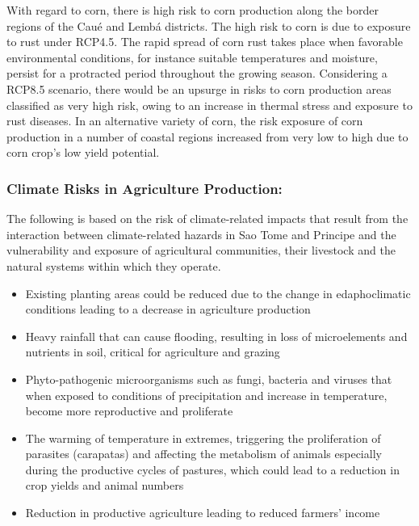 \documentclass[
]{book}
\providecommand{\tightlist}{%
  \setlength{\itemsep}{0pt}\setlength{\parskip}{0pt}}
\begin{document}
With regard to corn, there is high risk to corn production along the border regions of the Caué and Lembá districts. The high risk to corn is due to exposure to rust under RCP4.5. The rapid spread of corn rust takes place when favorable environmental conditions, for instance suitable temperatures and moisture, persist for a protracted period throughout the growing season. Considering a RCP8.5 scenario, there would be an upsurge in risks to corn production areas classified as very high risk, owing to an increase in thermal stress and exposure to rust diseases. In an alternative variety of corn, the risk exposure of corn production in a number of coastal regions increased from very low to high due to corn crop's low yield potential.

\hypertarget{climate-risks-in-agriculture-production-1}{%
\subsubsection{Climate Risks in Agriculture Production:}\label{climate-risks-in-agriculture-production-1}}

The following is based on the risk of climate-related impacts that result from the interaction between climate-related hazards in Sao Tome and Principe and the vulnerability and exposure of agricultural communities, their livestock and the natural systems within which they operate.

\begin{itemize}
\tightlist
\item
  Existing planting areas could be reduced due to the change in edaphoclimatic conditions leading to a decrease in agriculture production
\item
  Heavy rainfall that can cause flooding, resulting in loss of microelements and nutrients in soil, critical for agriculture and grazing
\item
  Phyto-pathogenic microorganisms such as fungi, bacteria and viruses that when exposed to conditions of precipitation and increase in temperature, become more reproductive and proliferate
\item
  The warming of temperature in extremes, triggering the proliferation of parasites (carapatas) and affecting the metabolism of animals especially during the productive cycles of pastures, which could lead to a reduction in crop yields and animal numbers
\item
  Reduction in productive agriculture leading to reduced farmers' income
\end{itemize}
\end{document}
